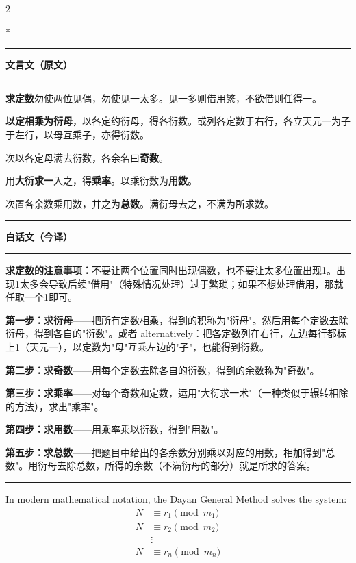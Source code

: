 \documentclass[11pt,a4paper]{article}
\newcommand{\leftcolheader}{%
  \noindent\textcolor{leftheader}{\rule{\columnwidth}{1.5pt}}\par
  \vspace{2pt}
  \noindent\textbf{\color{leftheader}\chinese 文言文（原文）}\par
  \vspace{2pt}
  \noindent\textcolor{leftheader}{\rule{\columnwidth}{0.6pt}}\par
  \vspace{4pt}
}
\newcommand{\rightcolheader}{%
  \noindent\textcolor{rightheader}{\rule{\columnwidth}{1.5pt}}\par
  \vspace{2pt}
  \noindent\textbf{\color{rightheader}\chinese 白话文（今译）}\par
  \vspace{2pt}
  \noindent\textcolor{rightheader}{\rule{\columnwidth}{0.6pt}}\par
  \vspace{4pt}
}
\begin{document}
\begin{paracol}{2}

\switchcolumn[0]*\leftcolheader

\small
\textbf{求定数}勿使两位见偶，勿使见一太多。见一多则借用繁，不欲借则任得一。

\textbf{以定相乘为衍母}，以各定约衍母，得各衍数。或列各定数于右行，各立天元一为子于左行，以母互乘子，亦得衍数。

次以各定母满去衍数，各余名曰\textbf{奇数}。

用\textbf{大衍求一}入之，得\textbf{乘率}。以乘衍数为\textbf{用数}。

次置各余数乘用数，并之为\textbf{总数}。满衍母去之，不满为所求数。

\switchcolumn\rightcolheader

\small\color{prefacecolor}
\textbf{求定数的注意事项：}不要让两个位置同时出现偶数，也不要让太多位置出现1。出现1太多会导致后续"借用"（特殊情况处理）过于繁琐；如果不想处理借用，那就任取一个1即可。

\textbf{第一步：求衍母}——把所有定数相乘，得到的积称为"衍母"。然后用每个定数去除衍母，得到各自的"衍数"。或者 alternatively：把各定数列在右行，左边每行都标上1（天元一），以定数为"母"互乘左边的"子"，也能得到衍数。

\textbf{第二步：求奇数}——用每个定数去除各自的衍数，得到的余数称为"奇数"。

\textbf{第三步：求乘率}——对每个奇数和定数，运用"大衍求一术"（一种类似于辗转相除的方法），求出"乘率"。

\textbf{第四步：求用数}——用乘率乘以衍数，得到"用数"。

\textbf{第五步：求总数}——把题目中给出的各余数分别乘以对应的用数，相加得到"总数"。用衍母去除总数，所得的余数（不满衍母的部分）就是所求的答案。

\end{paracol}

\vspace{0.5em}
\noindent\textcolor{rulecolor}{\rule{\textwidth}{0.4pt}}

In modern mathematical notation, the Dayan General Method solves the system:
\begin{align*}
N &\equiv r_1 \pmod{m_1} \\
N &\equiv r_2 \pmod{m_2} \\
&\vdots \\
N &\equiv r_n \pmod{m_n}
\end{align*}
\end{document}
